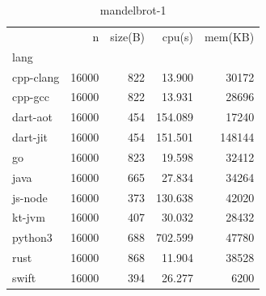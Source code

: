 \begin{table}[ht]
    \caption{mandelbrot-1}
    \label{tab:mandelbrot-1}
    \begin{center}
        \begin{tabular}{lrrrr}
            \toprule
            {}        & n     & size(B) & cpu(s)  & mem(KB) \\
            lang      &       &         &         &         \\
            \midrule
            cpp-clang & 16000 & 822     & 13.900  & 30172   \\
            cpp-gcc   & 16000 & 822     & 13.931  & 28696   \\
            dart-aot  & 16000 & 454     & 154.089 & 17240   \\
            dart-jit  & 16000 & 454     & 151.501 & 148144  \\
            go        & 16000 & 823     & 19.598  & 32412   \\
            java      & 16000 & 665     & 27.834  & 34264   \\
            js-node   & 16000 & 373     & 130.638 & 42020   \\
            kt-jvm    & 16000 & 407     & 30.032  & 28432   \\
            python3   & 16000 & 688     & 702.599 & 47780   \\
            rust      & 16000 & 868     & 11.904  & 38528   \\
            swift     & 16000 & 394     & 26.277  & 6200    \\
            \bottomrule
        \end{tabular}
    \end{center}
\end{table}


